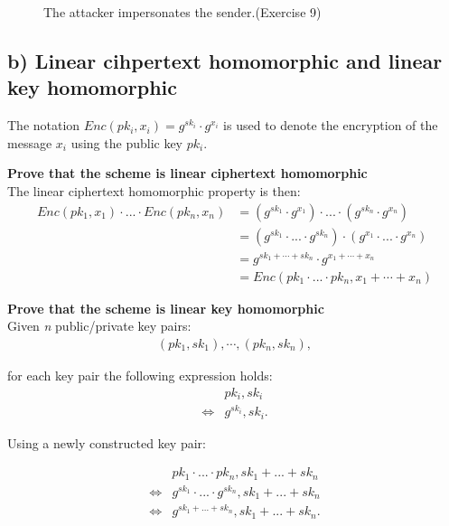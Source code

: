 \begin{figure}
\begin{tikzpicture}[x=0.75pt,y=0.75pt,yscale=-1,xscale=1]
    \end{tikzpicture}

    \caption{The attacker impersonates the sender.(Exercise 9)}\label{fig:imp_sender}
\end{figure}

\subsection*{b) Linear cihpertext homomorphic and linear key homomorphic}
%
The notation \(Enc(pk_i, x_i)=g^{sk_i}\cdot g^{x_i}\) is used to denote the encryption of the
message \(x_i\) using the public key \(pk_i\).

\textbf{Prove that the scheme is linear ciphertext homomorphic}\\

The linear ciphertext homomorphic property is then:
\begin{align*}
    Enc(pk_1, x_1) \cdot...\cdot Enc(pk_n, x_n) &= (g^{sk_1}\cdot g^{x_1})
    \cdot...\cdot(g^{sk_n}\cdot g^{x_n})\\
    &= (g^{sk_1}\cdot...\cdot g^{sk_n})\cdot(g^{x_1}\cdot...\cdot g^{x_n})\\
    &= g^{sk_1+\cdots +sk_n}\cdot g^{x_1+\cdots +x_n}\\
    &= Enc(pk_1\cdot...\cdot pk_n, x_1+\cdots +x_n)
\end{align*}

\textbf{Prove that the scheme is linear key homomorphic}\\
Given \emph{n} public/private key pairs:\\
\begin{align*}
    (pk_1,sk_1),\cdots,(pk_n,sk_n),
\end{align*}

for each key pair the following expression holds:
\begin{align*}
    &pk_i,sk_i\\
    \Leftrightarrow &g^{sk_i},sk_i.
\end{align*}

Using a newly constructed key pair:

\begin{align*}
    &pk_1\cdot...\cdot pk_n, sk_1+...+ sk_n\\
    \Leftrightarrow &g^{sk_1}\cdot...\cdot g^{sk_n}, sk_1+...+ sk_n\\
    \Leftrightarrow &g^{sk_1+...+sk_n}, sk_1+...+sk_n.
\end{align*}

